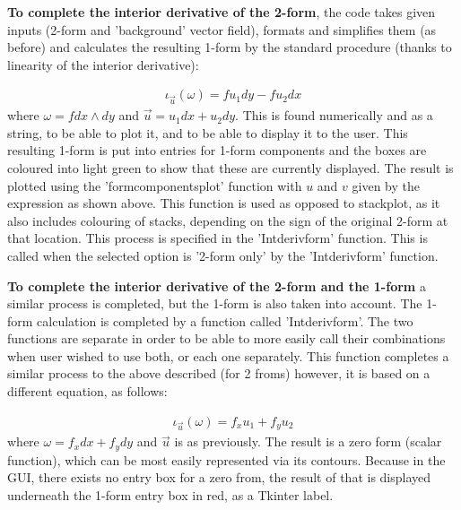 \documentclass[12pt]{report}
\begin{document}
\noindent \textbf{To complete the interior derivative of the 2-form}, the code takes given inputs (2-form and 'background' vector field), formats and simplifies them (as before) and calculates the resulting 1-form by the standard procedure (thanks to linearity of the interior derivative):

\begin{equation}
	\label{T2} \begin{split}
		\iota_{\vec{u}}(\omega) = f u_{1} dy - f u_{2} dx
	\end{split}
\end{equation}
where $\omega = f dx\wedge dy$ and $\vec{u} = u_{1}dx + u_{2}dy$.
This is found numerically and as a string, to be able to plot it, and to be able to display it to the user.
This resulting 1-form is put into entries for 1-form components and the boxes are coloured into light green to show that these are currently displayed. The result is plotted using the 'form\textunderscore components\textunderscore plot' function with $u$ and $v$ given by the expression as shown above. This function is used as opposed to stack\textunderscore plot, as it also includes colouring of stacks, depending on the sign of the original 2-form at that location.
This process is specified in the 'Int\textunderscore deriv\textunderscore form' function. This is called when the selected option is '2-form only' by the 'Int\textunderscore deriv\textunderscore form' function.

\noindent \textbf{To complete the interior derivative of the 2-form and the 1-form} a similar process is completed, but the 1-form is also taken into account. The 1-form calculation is completed by a function called 'Int\textunderscore deriv\textunderscore form'. The two functions are separate in order to be able to more easily call their combinations when user wished to use both, or each one separately. This function completes a similar process to the above described (for 2 froms) however, it is based on a different equation, as follows:

\begin{equation}
	\label{T2} \begin{split}
		\iota_{\vec{u}}(\omega) = f_{x} u_{1} + f_{y} u_{2}
	\end{split}
\end{equation}
where $\omega = f_{x} dx + f_{y} dy$ and $\vec{u}$ is as previously. The result is a zero form (scalar function), which can be most easily represented via its contours. Because in the GUI, there exists no entry box for a zero from, the result of that is displayed underneath the 1-form entry box in red, as a Tkinter label.
\end{document}
